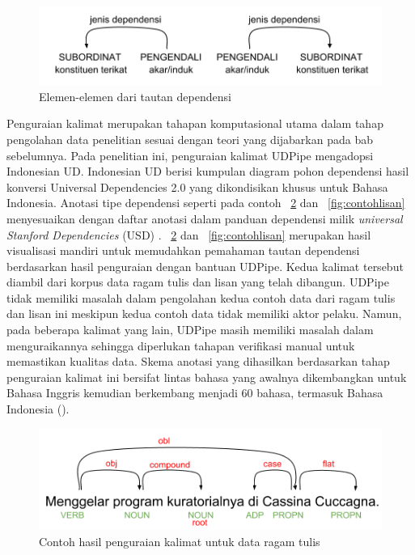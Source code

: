 \begin{figure}
	\centering \includegraphics[width=0.6
	\textwidth] {pics/tautandependensi.png} \caption{Elemen-elemen dari tautan dependensi} 
\label{fig:tautandependensi} \end{figure}

Penguraian kalimat merupakan tahapan komputasional utama dalam tahap pengolahan data penelitian sesuai dengan teori yang dijabarkan pada bab sebelumnya. Pada penelitian ini, penguraian kalimat UDPipe mengadopsi Indonesian UD. Indonesian UD berisi kumpulan diagram pohon dependensi hasil konversi Universal Dependencies 2.0 \citep{nivre2017universal} yang dikondisikan khusus untuk Bahasa Indonesia. Anotasi tipe dependensi seperti pada contoh \pic~\ref{fig:contohtulis} dan \pic~\ref{fig:contohlisan} menyesuaikan dengan daftar anotasi dalam panduan dependensi milik \textit{universal Stanford Dependencies} (USD) \citep{de2014universal}. \pic~\ref{fig:contohtulis} dan \pic~\ref{fig:contohlisan} merupakan hasil visualisasi mandiri untuk memudahkan pemahaman tautan dependensi berdasarkan hasil penguraian dengan bantuan UDPipe. Kedua kalimat tersebut diambil dari korpus data ragam tulis dan lisan yang telah dibangun. UDPipe tidak memiliki masalah dalam pengolahan kedua contoh data dari ragam tulis dan lisan ini meskipun kedua contoh data tidak memiliki aktor pelaku. Namun, pada beberapa kalimat yang lain, UDPipe masih memiliki masalah dalam menguraikannya sehingga diperlukan tahapan verifikasi manual untuk memastikan kualitas data. Skema anotasi yang dihasilkan berdasarkan tahap penguraian kalimat ini bersifat lintas bahasa yang awalnya dikembangkan untuk Bahasa Inggris kemudian berkembang menjadi 60 bahasa, termasuk Bahasa Indonesia (\citealp{de2008stanford, de2014universal, nivre2017universal}). 

\begin{figure}
	\centering \includegraphics[width=0.5
	\textwidth] {pics/contohtulis.png} \caption{Contoh hasil penguraian kalimat untuk data ragam tulis} 
\label{fig:contohtulis} \end{figure}

